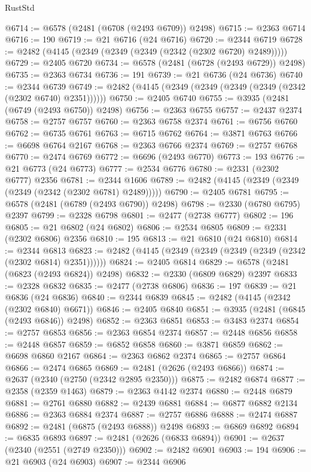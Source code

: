 \begin{lexlean}{RustStd}
\begin{coremodule}
@6714 := @6578 (@2481 (@6708 (@2493 @6709)) @2498)
@6715 := @2363 @6714
@6716 := 190
@6719 := @21 @6716 (@24 @6716)
@6720 := @2344 @6719
@6728 := @2482 (@4145 (@2349 (@2349 (@2349 (@2342 (@2302 @6720) @2489)))))
@6729 := @2405 @6720
@6734 := @6578 (@2481 (@6728 (@2493 @6729)) @2498)
@6735 := @2363 @6734
@6736 := 191
@6739 := @21 @6736 (@24 @6736)
@6740 := @2344 @6739
@6749 := @2482 (@4145 (@2349 (@2349 (@2349 (@2349 (@2342 (@2302 @6740) @2351))))))
@6750 := @2405 @6740
@6755 := @3935 (@2481 (@6749 (@2493 @6750)) @2498)
@6756 := @2363 @6755
@6757 := @2437 @2374
@6758 := @2757 @6757
@6760 := @2363 @6758 @2374
@6761 := @6756 @6760
@6762 := @6735 @6761
@6763 := @6715 @6762
@6764 := @3871 @6763
@6766 := @6698 @6764 @2167
@6768 := @2363 @6766 @2374
@6769 := @2757 @6768
@6770 := @2474 @6769
@6772 := @6696 (@2493 @6770)
@6773 := 193
@6776 := @21 @6773 (@24 @6773)
@6777 := @2534 @6776
@6780 := @2331 (@2302 @6777) @2356
@6781 := @2344 @1606
@6789 := @2482 (@4145 (@2349 (@2349 (@2349 (@2342 (@2302 @6781) @2489)))))
@6790 := @2405 @6781
@6795 := @6578 (@2481 (@6789 (@2493 @6790)) @2498)
@6798 := @2330 (@6780 @6795) @2397
@6799 := @2328 @6798
@6801 := @2477 (@2738 @6777)
@6802 := 196
@6805 := @21 @6802 (@24 @6802)
@6806 := @2534 @6805
@6809 := @2331 (@2302 @6806) @2356
@6810 := 195
@6813 := @21 @6810 (@24 @6810)
@6814 := @2344 @6813
@6823 := @2482 (@4145 (@2349 (@2349 (@2349 (@2349 (@2342 (@2302 @6814) @2351))))))
@6824 := @2405 @6814
@6829 := @6578 (@2481 (@6823 (@2493 @6824)) @2498)
@6832 := @2330 (@6809 @6829) @2397
@6833 := @2328 @6832
@6835 := @2477 (@2738 @6806)
@6836 := 197
@6839 := @21 @6836 (@24 @6836)
@6840 := @2344 @6839
@6845 := @2482 (@4145 (@2342 (@2302 @6840) @6671))
@6846 := @2405 @6840
@6851 := @3935 (@2481 (@6845 (@2493 @6846)) @2498)
@6852 := @2363 @6851
@6853 := @3483 @2374
@6854 := @2757 @6853
@6856 := @2363 @6854 @2374
@6857 := @2448 @6856
@6858 := @2448 @6857
@6859 := @6852 @6858
@6860 := @3871 @6859
@6862 := @6698 @6860 @2167
@6864 := @2363 @6862 @2374
@6865 := @2757 @6864
@6866 := @2474 @6865
@6869 := @2481 (@2626 (@2493 @6866))
@6874 := @2637 (@2340 (@2750 (@2342 @2895 @2350)))
@6875 := @2482 @6874
@6877 := @2358 (@2359 @1463)
@6879 := @2363 @4142 @2374
@6880 := @2448 @6879
@6881 := @2761 @6880
@6882 := @2439 @6881
@6884 := @6877 @6882 @2134
@6886 := @2363 @6884 @2374
@6887 := @2757 @6886
@6888 := @2474 @6887
@6892 := @2481 (@6875 (@2493 @6888)) @2498
@6893 := @6869 @6892
@6894 := @6835 @6893
@6897 := @2481 (@2626 (@6833 @6894))
@6901 := @2637 (@2340 (@2551 (@2749 @2350)))
@6902 := @2482 @6901
@6903 := 194
@6906 := @21 @6903 (@24 @6903)
@6907 := @2344 @6906

\end{coremodule}
\end{lexlean}
